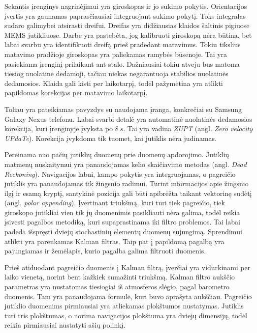 Sekantis įrenginys nagrinėjimui yra giroskopas ir jo sukimo pokytis. Orientacijos įvertis yra gaunamas paprasčiausiai integruojant sukimo pokytį. Toks integralas sudaro galimybei atsirasti dreifui. Dreifas yra didžiausias klaidos šaltinis pigiuose MEMS jutikliuose. Darbe yra pastebėta, jog kalibruoti giroskopą nėra būtina, bet labai svarbu yra identifikuoti dreifą prieš pradedant matavimus. Tokiu tikslius matavimo pradžioje giroskopas yra paliekamas ramybės būsenoje. Tai yra pasiekiama įrenginį prilaikant ant stalo. Dažniausiai tokiu atveju bus matoma tiesiog nuolatinė dedamoji, tačiau niekas negarantuoja stabilios nuolatinės dedamosios. Klaida gali kisti per laikotarpį, todėl pažymėtina yra atlikti papildomas korekcijas per matavimo laikotarpį.

Toliau yra pateikiamas pavyzdys su naudojama įranga, konkrečiai su Samsung Galaxy Nexus telefonu. Labai svarbi detalė yra automatinė nuolatinės dedamosios korekcija, kuri įrenginyje įvyksta po $8~s$. Tai yra vadina \textit{ZUPT} (angl. \textit{Zero velocity UPdaTe}). Korekcija įvykdoma tik tuomet, kai jutiklis nėra judinamas.

Pereinama nuo pačių jutiklių duomenų prie duomenų apdorojimo. Jutiklių matmenų nuskaitymui yra panaudojamas kelio skaičiavimo metodas (angl. \textit{Dead Reckoning}). Navigacijos labui, kampo pokytis yra integruojamas, o pagreičio jutiklis yra panaudojamas tik žingsnio radimui. Turint informacijos apie žingsnio ilgį ir esamą kryptį, santykinė pozicija gali būti apibrėžta taikant vektorinę sudėtį (angl. \textit{polar appending}). Įvertinant triukšmą, kuri turi tiek pagreičio, tiek giroskopo jutikliai vien tik jų duomenimis pasikliauti nėra galima, todėl reikia įsivesti pagalbos metodiką, kuri supaprastinama iki filtro problemos. Tai labai padeda išspręsti dviejų stochastinių elementų duomenų sujungimą. Sprendimui atlikti yra parenkamas Kalman filtras. Taip pat į papildomą pagalbą yra pajungiamas ir žemėlapis, kurio pagalba galima filtruoti duomenis.

Prieš atiduodant pagreičio duomenis į Kalman filtrą, įverčiai yra vidurkinami per laiko vienetą, norint bent kažkiek sumažinti triukšmą. Kalman filtro aukščio parametras yra nustatomas tiesiogiai iš atmosferos slėgio, pagal barometro duomenis. Tam yra panaudojama formulė, kuri buvo aprašyta aukščiau. Pagreičio jutiklio duomenims pirmiausiai yra atliekamas plokštumos nustatymas. Jutiklis turi tris plokštumas, o norima navigacijos plokštuma yra dviejų dimensijų, todėl reikia pirmiausiai nustatyti ašių polinkį.

